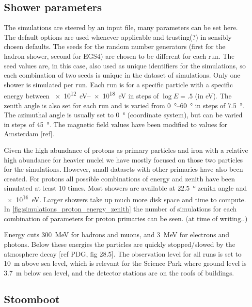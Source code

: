 \subsection{Shower parameters}

The simulations are steered by an input file, many parameters can be set
here. The default options are used whenever applicable and trusting(?)
in sensibly chosen defaults. The seeds for the random number generators
(first for the hadron shower, second for EGS4) are chosen to be
different for each run. The seed values are, in this case, also used as
unique identifiers for the simulations, so each combination of two seeds
is unique in the dataset of simulations. Only one shower is simulated
per run. Each run is for a specific particle with a specific energy
between \SIrange{e12}{e18}{\electronvolt} in steps of $\log E = .5$
(in eV). The zenith angle is also set for each run and is varied from
\SIrange{0}{60}{\degree} in steps of \SI{7.5}{\degree}. The azimuthal
angle is usually set to \SI{0}{\degree} (\hisparc coordinate system),
but can be varied in steps of \SI{45}{\degree}. The magnetic field
values have been modified to values for Amsterdam [ref].

Given the high abundance of protons as primary particles and iron with a
relative high abundance for heavier nuclei we have mostly focused on
those two particles for the simulations. However, small datasets with
other primaries have also been created. For protons all possible
combinations of energy and zenith have been simulated at least 10 times.
Most showers are available at \SI{22.5}{\degree} zenith angle and
\SI{e16}{\electronvolt}. Larger showers take up much more disk space and
time to compute. In \ref{fig:simulations_proton_energy_zenith} the
number of simulations for each combination of parameters for proton
primaries can be seen. (at time of writing..)

Energy cuts \SI{300}{\mega\electronvolt} for hadrons and muons, and
\SI{3}{\mega\electronvolt} for electrons and photons. Below these
energies the particles are quickly stopped/slowed by the atmosphere
decay [ref PDG, fig 28.5]. The observation level for all runs is set to
\SI{10}{\meter} above sea level, which is relevant for the Science Park
where ground level is \SI{3.7}{\meter} below sea level, and the detector
stations are on the roofs of buildings.


\subsection{Stoomboot}

